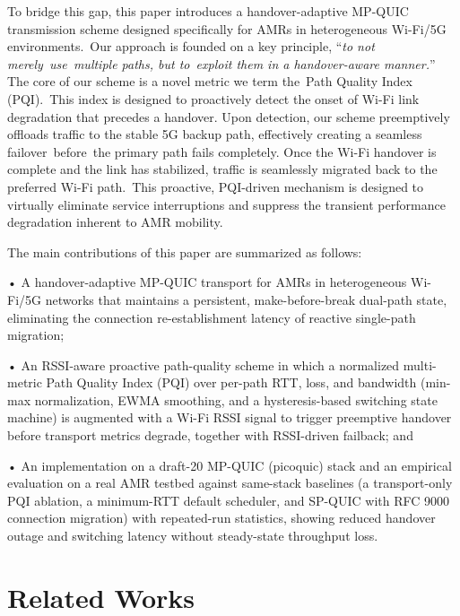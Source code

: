 \documentclass[preprint,11pt]{elsarticle}
\begin{document}
To bridge this gap, this paper introduces a handover-adaptive MP-QUIC transmission scheme designed specifically for AMRs in heterogeneous Wi-Fi/5G environments.~Our approach is founded on a key principle, ``\emph{to not merely~use~multiple paths, but to~exploit them in a handover-aware manner.}'' The core of our scheme is a novel metric we term the~Path Quality Index (PQI).~This index is designed to proactively detect the onset of Wi-Fi link degradation that precedes a handover. Upon detection, our scheme preemptively offloads traffic to the stable 5G backup path, effectively creating a seamless failover~before~the primary path fails completely. Once the Wi-Fi handover is complete and the link has stabilized, traffic is seamlessly migrated back to the preferred Wi-Fi path.~This proactive, PQI-driven mechanism is designed to virtually eliminate service interruptions and suppress the transient performance degradation inherent to AMR mobility.

The main contributions of this paper are summarized as follows:

• A handover-adaptive MP-QUIC transport for AMRs in heterogeneous Wi-Fi/5G networks that maintains a persistent, make-before-break dual-path state, eliminating the connection re-establishment latency of reactive single-path migration;

• An RSSI-aware proactive path-quality scheme in which a normalized multi-metric Path Quality Index (PQI) over per-path RTT, loss, and bandwidth (min-max normalization, EWMA smoothing, and a hysteresis-based switching state machine) is augmented with a Wi-Fi RSSI signal to trigger preemptive handover before transport metrics degrade, together with RSSI-driven failback; and

• An implementation on a draft-20 MP-QUIC (picoquic) stack and an empirical evaluation on a real AMR testbed against same-stack baselines (a transport-only PQI ablation, a minimum-RTT default scheduler, and SP-QUIC with RFC 9000 connection migration) with repeated-run statistics, showing reduced handover outage and switching latency without steady-state throughput loss.
\section{Related Works}
\end{document}
